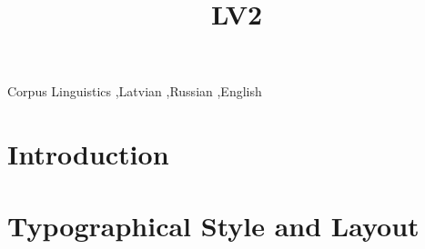 \documentclass{IOS-Book-Article}
\begin{document}
\begin{frontmatter}              %

\title{LV2}



%

\begin{keyword}
Corpus Linguistics \sep Latvian \sep Russian \sep English
\end{keyword}
\end{frontmatter}

\thispagestyle{empty}
\pagestyle{empty}

\section*{Introduction}

\section{Typographical Style and Layout}
\end{document}
